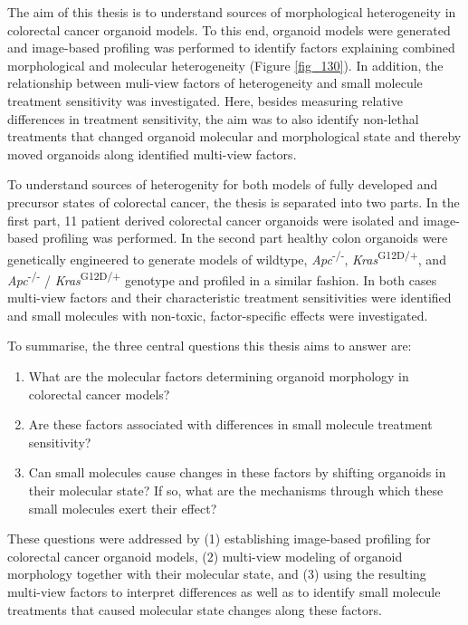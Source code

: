 \begin{flushleft}
The aim of this thesis is to understand sources of morphological heterogeneity in colorectal cancer organoid models. To this end, organoid models were generated and image-based profiling was performed to identify factors explaining combined morphological and molecular heterogeneity (Figure \ref{fig_130}). In addition, the relationship between muli-view factors of heterogeneity and small molecule treatment sensitivity was investigated. Here, besides measuring relative differences in treatment sensitivity, the aim was to also identify non-lethal treatments that changed organoid molecular and morphological state and thereby moved organoids along identified multi-view factors.
\bigbreak

To understand sources of heterogenity for both models of fully developed and precursor states of colorectal cancer, the thesis is separated into two parts. In the first part, 11 patient derived colorectal cancer organoids were isolated and image-based profiling was performed. In the second part healthy colon organoids were genetically engineered to generate models of wildtype, \textit{Apc}\textsuperscript{-/-}, \textit{Kras}\textsuperscript{G12D/+}, and \textit{Apc}\textsuperscript{-/-} / \textit{Kras}\textsuperscript{G12D/+} genotype and profiled in a similar fashion. In both cases multi-view factors and their characteristic treatment sensitivities were identified and small molecules with non-toxic, factor-specific effects were investigated.

To summarise, the three central questions this thesis aims to answer are:
\begin{enumerate}
    \item What are the molecular factors determining organoid morphology in colorectal cancer models?
    \item Are these factors associated with differences in small molecule treatment sensitivity? 
    \item Can small molecules cause changes in these factors by shifting organoids in their molecular state? If so, what are the mechanisms through which these small molecules exert their effect?
\end{enumerate}

These questions were addressed by (1) establishing image-based profiling for colorectal cancer organoid models, (2) multi-view modeling of organoid morphology together with their molecular state, and (3) using the resulting multi-view factors to interpret differences as well as to identify small molecule treatments that caused molecular state changes along these factors.

\end{flushleft}